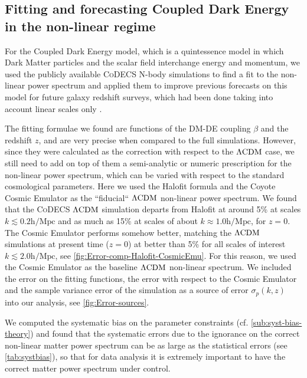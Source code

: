  
\subsection*{Fitting and forecasting Coupled Dark Energy in the non-linear regime}


For the Coupled Dark Energy model, which is a quintessence model in which Dark Matter particles and the scalar field interchange
energy and momentum, we used the publicly available \textsc{CoDECS} N-body simulations  
to find a fit to the non-linear power spectrum and
applied them to improve previous forecasts on this model for future galaxy redshift surveys, which had been done taking
into account linear scales only .

The fitting formulae we found are functions of the DM-DE coupling $\beta$ and the redshift $z$, and are very precise when compared to the  full simulations.
However, since they were calculated as the correction with respect to the $\Lambda\mathrm{CDM}$ case, 
we still need to add on top of them a semi-analytic or numeric prescription for the non-linear power spectrum, which
can be varied with respect to the standard cosmological parameters.
Here we used the Halofit formula and the Coyote Cosmic Emulator as the ``fiducial`` $\Lambda\mathrm{CDM}$ non-linear power spectrum. 
We found that the \textsc{CoDECS} $\Lambda\mathrm{CDM}$ simulation departs from Halofit at around 5\% 
at scales $k \lesssim 0.2 \mathrm{h/Mpc}$ and as much as 15\% at scales of about $k \approx 1.0 \mathrm{h/Mpc}$, for $z=0$.
The Cosmic Emulator performs somehow better, matching the $\Lambda\mathrm{CDM}$ simulations at present time ($z=0$) at better than 5\%
for all scales of interest $k \lesssim 2.0 \mathrm{h/Mpc}$, see \cref{fig:Error-comp-Halofit-CosmicEmu}. 
For this reason, we used the Cosmic Emulator as the baseline $\Lambda\mathrm{CDM}$ non-linear spectrum.
We included the error on the fitting functions, the error with respect to the Cosmic Emulator and the sample variance error
of the simulation as a source of error $\sigma_p(k,z)$ into our analysis, see \cref{fig:Error-sources}.

We computed the systematic bias on the parameter constraints (cf. \cref{sub:syst-bias-theory}) and 
found that the systematic errors due to the ignorance on the correct non-linear matter power spectrum can be as large as the statistical errors
(see \cref{tab:systbias}),
so that for data analysis it is extremely important to have the correct matter power spectrum under control.

